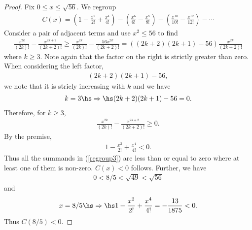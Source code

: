 \documentclass{article}
\begin{document}
\begin{proof}
   Fix $0\leq x\leq\sqrt{56}$. We regroup
   \begin{align}
      \label{regroup3}
      C(x)= \left(1 - \frac{x^2}{2!} + \frac{x^4}{4!} \right)
      - \left(\frac{x^6}{6!}-\frac{x^8}{8!}\right)
      - \left(\frac{x^{10}}{10!}-\frac{x^{12}}{12!}\right)
      - \cdots
   \end{align}
   Consider a pair of adjacent terms and use $x^2\leq 56$ to find 
   \begin{align*}
      \frac{x^{2k}}{(2k)!}-\frac{x^{2k+2}}{(2k+2)!} \geq 
      \frac{x^{2k}}{(2k)!}-\frac{56x^{2k}}{(2k+2)!} =
      ((2k+2)(2k+1)-56)\frac{x^{2k}}{(2k+2)!}
   \end{align*}
   where $k\geq 3$. Note again that the factor on the right is strictly
   greater than zero. When considering the left factor,
   \begin{align*}
      (2k+2)(2k+1) - 56, 
   \end{align*}
   we note that it is stricly increasing with $k$ and we have 
   \begin{align*}
      k=3 \hs\Rightarrow\hs (2k+2)(2k+1) - 56 = 0.
   \end{align*}
   Therefore, for $k\geq 3$, 
   \begin{align*}
      \frac{x^{2k}}{(2k)!}-\frac{x^{2k+2}}{(2k+2)!}\geq 0.
   \end{align*}
   By the premise, 
   \begin{align*}
      1 - \frac{x^2}{2!} + \frac{x^4}{4!} < 0.
   \end{align*}
   Thus all the summands in (\ref{regroup3}) are less than or equal to zero 
   where at least one of them is non-zero. $C(x)<0$ follows. 
   Further, we have 
   \begin{align*}
      0 < 8/5 < \sqrt{49} < \sqrt{56}
   \end{align*}
   and 
   \begin{align*}
      x = 8/5 \hs\Rightarrow\hs 1-\frac{x^2}{2!}+\frac{x^4}{4!} = -\frac{13}{1875} < 0. 
   \end{align*}
   Thus $C(8/5)<0$.
\end{proof}
\end{document}

